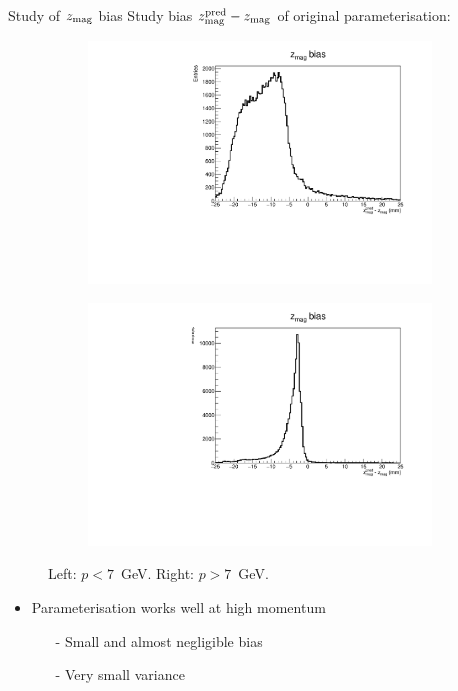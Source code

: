 \documentclass[xcolor={dvipsnames}]{beamer}
\begin{document}
\begin{frame}{Study of $z_{\rm mag}$ bias}
  \vspace{0.0cm}
  {\Large Study bias $z_{\rm mag}^{\rm pred} - z_{\rm mag}$ of original parameterisation:}
  \begin{figure}[htb]
    \centering
    \begin{subfigure}{0.50\textwidth}
      \includegraphics[width=1\textwidth]{Plots/z_mag_position_bias_old_parameterisation_low_p.pdf}
    \end{subfigure}%
    \begin{subfigure}{0.50\textwidth}
      \includegraphics[width=1\textwidth]{Plots/z_mag_position_bias_old_parameterisation_high_p.pdf}
    \end{subfigure}
    \vspace{-0.2cm}
    \caption*{Left: $p < 7$~GeV. Right: $p > 7$~GeV.}
  \end{figure}
  \vspace{-0.5cm}
  \begin{itemize}
    \item{Parameterisation works well at high momentum}
    \begin{itemize}
      \item[-]{Small and almost negligible bias}
      \item[-]{Very small variance}
    \end{itemize}
  \end{itemize}
\end{frame}
\end{document}
